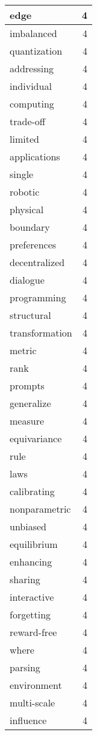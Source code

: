 \begin{table}[h]
\begin{tabular}{|l|r|}
\hline
edge & 4 \\
\hline
imbalanced & 4 \\
\hline
quantization & 4 \\
\hline
addressing & 4 \\
\hline
individual & 4 \\
\hline
computing & 4 \\
\hline
trade-off & 4 \\
\hline
limited & 4 \\
\hline
applications & 4 \\
\hline
single & 4 \\
\hline
robotic & 4 \\
\hline
physical & 4 \\
\hline
boundary & 4 \\
\hline
preferences & 4 \\
\hline
decentralized & 4 \\
\hline
dialogue & 4 \\
\hline
programming & 4 \\
\hline
structural & 4 \\
\hline
transformation & 4 \\
\hline
metric & 4 \\
\hline
rank & 4 \\
\hline
prompts & 4 \\
\hline
generalize & 4 \\
\hline
measure & 4 \\
\hline
equivariance & 4 \\
\hline
rule & 4 \\
\hline
laws & 4 \\
\hline
calibrating & 4 \\
\hline
nonparametric & 4 \\
\hline
unbiased & 4 \\
\hline
equilibrium & 4 \\
\hline
enhancing & 4 \\
\hline
sharing & 4 \\
\hline
interactive & 4 \\
\hline
forgetting & 4 \\
\hline
reward-free & 4 \\
\hline
where & 4 \\
\hline
parsing & 4 \\
\hline
environment & 4 \\
\hline
multi-scale & 4 \\
\hline
influence & 4 \\

\end{tabular}
\end{table}
